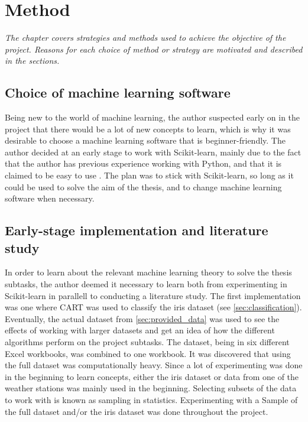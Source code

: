 \chapter{Method}
\emph{The chapter covers strategies and methods used to achieve the objective of the project. Reasons for each choice of method or strategy are motivated and described in the sections.}




\section{Choice of machine learning software}
	Being new to the world of machine learning, the author suspected early on in the project that there would be a lot of new concepts to learn, which is why it was desirable to choose a machine learning software that is beginner-friendly. The author decided at an early stage to work with Scikit-learn, mainly due to the fact that the author has previous experience working with Python, and that it is claimed to be easy to use \cite{WEBSITE:27}. The plan was to stick with Scikit-learn, so long as it could be used to solve the aim of the thesis, and to change machine learning software when necessary. 

\section{Early-stage implementation and literature study} \label{sec:literature_study}
	In order to learn about the relevant machine learning theory to solve the thesis subtasks, the author deemed it necessary to learn both from experimenting in Scikit-learn in parallell to conducting a literature study. The first implementation was one where CART was used to classify the iris dataset (see \ref{sec:classification}). Eventually, the actual dataset from \ref{sec:provided_data} was used to see the effects of working with larger datasets and get an idea of how the different algorithms perform on the project subtasks. The dataset, being in six different Excel workbooks, was combined to one workbook.  It was discovered that using the full dataset was computationally heavy. Since a lot of experimenting was done in the beginning to learn concepts, either the iris dataset or data from one of the weather stations was mainly used in the beginning. Selecting subsets of the data to work with is known as sampling in statistics. Experimenting with a Sample of the full dataset and/or the iris dataset was done throughout the project.

